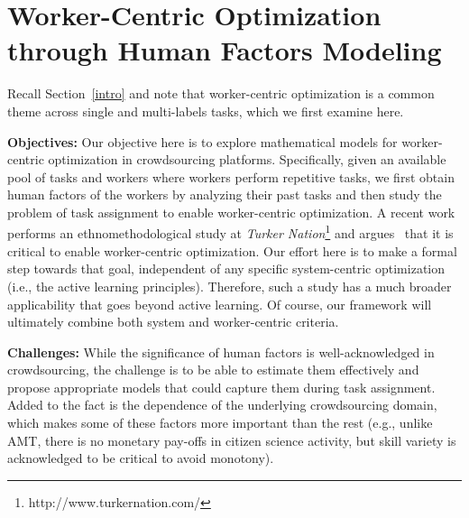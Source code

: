 \vspace{-0.2in}
\section{Worker-Centric Optimization through Human Factors Modeling}\label{hf}
\vspace{-0.1in}
Recall Section~\ref{intro} and note that worker-centric optimization is a common theme across single and multi-labels tasks, which we first examine here.

{\bf Objectives:}
Our objective here is to explore mathematical models for worker-centric optimization in crowdsourcing platforms. Specifically, given an available pool of tasks and workers where workers perform repetitive tasks, we first obtain human factors of the workers by analyzing their past tasks and then study the problem of task assignment to enable worker-centric optimization. A recent work performs an ethnomethodological study at {\em Turker Nation}\footnote{\small http://www.turkernation.com/} and argues~\cite{martin2014being} that it is critical to enable worker-centric optimization.
Our effort here is to make a formal step towards that goal, independent of any specific system-centric optimization (i.e., the active learning principles). Therefore, such a study has a much broader applicability that goes beyond active learning. Of course, our framework will ultimately combine both system and worker-centric criteria. 

 {\bf Challenges:} While the significance of human factors is well-acknowledged in crowdsourcing, the challenge is to be able to estimate them effectively and propose appropriate models that could capture them during task assignment. Added to the fact is the dependence of the underlying crowdsourcing domain, which makes some of these factors more important than the rest (e.g., unlike AMT, there is no monetary pay-offs in citizen science activity, but skill variety is acknowledged to be critical to avoid monotony). 

